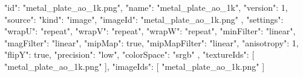 {
  "id": "metal_plate_ao_1k.png",
  "name": "metal_plate_ao_1k",
  "version": 1,
  "source": {
    "kind": "image",
    "imageId": "metal_plate_ao_1k.png"
  },
  "settings": {
    "wrapU": "repeat",
    "wrapV": "repeat",
    "wrapW": "repeat",
    "minFilter": "linear",
    "magFilter": "linear",
    "mipMap": true,
    "mipMapFilter": "linear",
    "anisotropy": 1,
    "flipY": true,
    "precision": "low",
    "colorSpace": "srgb"
  },
  "textureIds": [
    "metal_plate_ao_1k.png"
  ],
  "imageIds": [
    "metal_plate_ao_1k.png"
  ]
}
